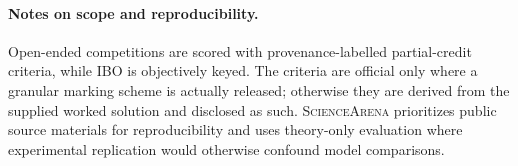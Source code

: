 \documentclass[11pt]{article}
\begin{document}
\paragraph{Notes on scope and reproducibility.}
Open-ended competitions are scored with provenance-labelled partial-credit criteria, while IBO is objectively keyed. The criteria are official only where a granular marking scheme is actually released; otherwise they are derived from the supplied worked solution and disclosed as such. \textsc{ScienceArena} prioritizes public source materials for reproducibility and uses theory-only evaluation where experimental replication would otherwise confound model comparisons.



% 


\end{document}

